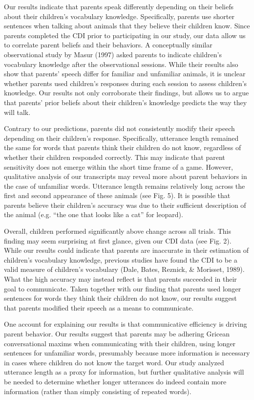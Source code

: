 \documentclass[10pt, letterpaper]{article}
\begin{document}
Our results indicate that parents speak differently depending on their
beliefs about their children's vocabulary knowledge. Specifically,
parents use shorter sentences when talking about animals that they
believe their children know. Since parents completed the CDI prior to
participating in our study, our data allow us to correlate parent
beliefs and their behaviors. A conceptually similar observational study
by Masur (1997) asked parents to indicate children's vocabulary
knowledge after the observational sessions. While their results also
show that parents' speech differ for familiar and unfamiliar animals, it
is unclear whether parents used children's responses during each session
to assess children's knowledge. Our results not only corroborate their
findings, but allows us to argue that parents' prior beliefs about their
children's knowledge predicts the way they will talk.

Contrary to our predictions, parents did not consistently modify their
speech depending on their children's response. Specifically, utterance
length remained the same for words that parents think their children do
not know, regardless of whether their children responded correctly. This
may indicate that parent sensitivity does not emerge within the short
time frame of a game. However, qualitative analysis of our transcripts
may reveal more about parent behaviors in the case of unfamiliar words.
Utterance length remains relatively long across the first and second
appearance of these animals (see Fig. 5). It is possible that parents
believe their children's accuracy was due to their sufficient
description of the animal (e.g. ``the one that looks like a cat'' for
leopard).

Overall, children performed significantly above change across all
trials. This finding may seem surprising at first glance, given our CDI
data (see Fig. 2). While our results could indicate that parents are
inaccurate in their estimation of children's vocabulary knowledge,
previous studies have found the CDI to be a valid measure of children's
vocabulary (Dale, Bates, Reznick, \& Morisset, 1989). What the high
accuracy may instead reflect is that parents succeeded in their goal to
communicate. Taken together with our finding that parents used longer
sentences for words they think their children do not know, our results
suggest that parents modified their speech as a means to communicate.

One account for explaining our results is that communicative efficiency
is driving parent behavior. Our results suggest that parents may be
adhering Gricean conversational maxims when communicating with their
children, using longer sentences for unfamiliar words, presumably
because more information is necessary in cases where children do not
know the target word. Our study analyzed utterance length as a proxy for
information, but further qualitative analysis will be needed to
determine whether longer utterances do indeed contain more information
(rather than simply consisting of repeated words).
\end{document}
